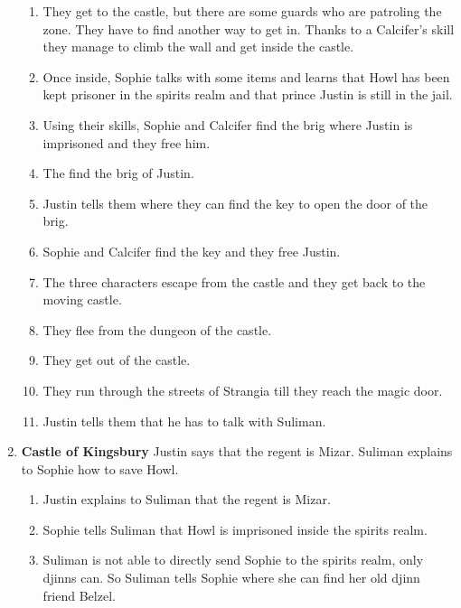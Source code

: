 \begin{enumerate}
\begin{enumerate}
  \item They get to the castle, but there are some guards who are patroling the zone. They have to find another way to get in. Thanks to a Calcifer’s skill they manage to climb the wall and get inside the castle.
    
  \item Once inside, Sophie talks with some items and learns that Howl has been kept prisoner in the spirits realm and that prince Justin is still in the jail.
    
  \item Using their skills, Sophie and Calcifer find the brig where Justin is imprisoned and they free him.
    
  \item The find the brig of Justin.
    
  \item Justin tells them where they can find the key to open the door of the brig.
    
  \item Sophie and Calcifer find the key and they free Justin.
    
  \item The three characters escape from the castle and they get back to the moving castle.
    
  \item They flee from the dungeon of the castle.
    
  \item They get out of the castle.
    
  \item They run through the streets of Strangia till they reach the magic door.
    
  \item Justin tells them that he has to talk with Suliman.
  \end{enumerate}

\item \textbf{Castle of Kingsbury} Justin says that the regent is Mizar. Suliman explains to Sophie how to save Howl.

  \begin{enumerate}
  \item Justin explains to Suliman that the regent is Mizar.
    
  \item Sophie tells Suliman that Howl is imprisoned inside the spirits realm.
    
  \item Suliman is not able to directly send Sophie to the spirits realm, only djinns can. So Suliman tells Sophie where she can find her old djinn friend Belzel.
    

\end{enumerate}
\end{enumerate}
